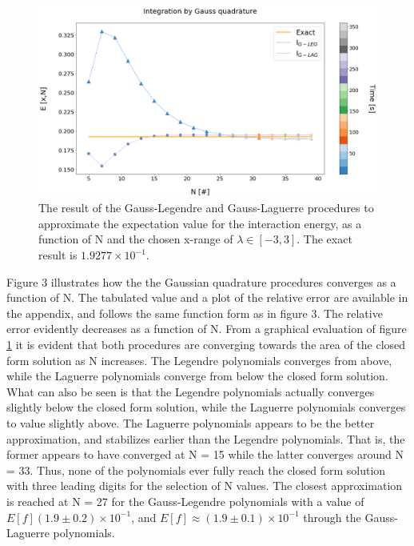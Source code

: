 \documentclass[%
reprint,nofootinbib,
amsmath,amssymb,
aps,
]{revtex4-1}
\begin{document}
\begin{figure}[!ht]
	\includegraphics[scale = 0.4]{Gauss_lagleg_2.png}
	\caption{\label{integrated_results} The result of the Gauss-Legendre and Gauss-Laguerre procedures to approximate the expectation value for the interaction energy, as a function of N and the chosen x-range of $\lambda \in[-3,3]$. The exact result is $1.9277\times 10^{-1}$. \vspace{2cm}}
\end{figure}
\noindent 
Figure 3 illustrates how the the Gaussian quadrature procedures converges as a function of N. The tabulated value and a plot of the relative error are available in the appendix, and follows the same function form as in figure 3. The relative error evidently decreases as a function of N. From a graphical evaluation of figure \ref{integrated_results} it is evident that both procedures are converging towards the area of the closed form solution as N increases. The Legendre polynomials converges from above, while the Laguerre polynomials converge from below the closed form solution. What can also be seen is that the Legendre polynomials actually converges slightly below the closed form solution, while the Laguerre polynomials converges to value slightly above. The Laguerre polynomials appears to be the better approximation, and stabilizes earlier than the Legendre polynomials. That is, the former appears to have converged at N = 15 while the latter converges around N = 33. Thus, none of the polynomials ever fully reach the closed form solution with three leading digits for the selection of N values. The closest approximation is reached at N = 27 for the Gauss-Legendre polynomials with a value of $E[f] (1.9 \pm 0.2)\times 10^{-1}$, and $E[f]\approx (1.9 \pm 0.1)\times 10^{-1}$ through the Gauss-Laguerre polynomials. \newpage  \noindent 
\end{document}
